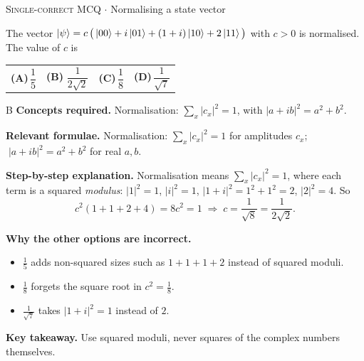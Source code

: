 \documentclass[11pt,a4paper]{article}
\newcommand{\optlabel}[1]{\textbf{(#1)}}
\newcommand{\correctlabel}[1]{\textcolor{okgreen}{\textbf{(#1)}\,\ding{51}}}
\newenvironment{qitem}[1]{\begin{list}{}{\setlength{\leftmargin}{3.3em}\setlength{\labelwidth}{3.1em}%
  \setlength{\labelsep}{0.2em}\setlength{\topsep}{3pt}\setlength{\parsep}{3pt}}\item[\textbf{Q.#1}\hfill]}{\end{list}}
\newcommand{\qsep}{\par\vspace{2pt}{\color{black!15}\hrule}\vspace{4pt}}
\newcommand{\qmeta}[2]{{\footnotesize\color{black!60}\textsc{#1} \;$\cdot$\; #2}\par}
\begin{document}
\begin{qitem}{12}
\qmeta{Single-correct MCQ}{Normalising a state vector}
The vector $\ket\psi = c\,\big(\ket{00} + i\ket{01} + (1 + i)\ket{10} + 2\ket{11}\big)$ with $c > 0$ is normalised. The value of $c$ is
\par\smallskip\noindent\begin{tabularx}{\linewidth}{@{}*{4}{L}@{}}
\optlabel{A}\,$\dfrac15$ & \correctlabel{B}\,$\dfrac{1}{2\sqrt2}$ & \optlabel{C}\,$\dfrac18$ & \optlabel{D}\,$\dfrac{1}{\sqrt7}$
\end{tabularx}
\end{qitem}
\begin{solbox}{B}
\textbf{\color{brand}Concepts required.} Normalisation: $\sum_x|c_x|^2 = 1$, with $|a + ib|^2 = a^2 + b^2$.

\textbf{\color{brand}Relevant formulae.} Normalisation: $\sum_x|c_x|^2 = 1$ for amplitudes $c_x$; $\;|a + ib|^2 = a^2 + b^2$ for real $a, b$.

\textbf{\color{brand}Step-by-step explanation.} Normalisation means $\sum_x|c_x|^2 = 1$, where each term is a squared \emph{modulus}: $|1|^2 = 1$, $|i|^2 = 1$, $|1 + i|^2 = 1^2 + 1^2 = 2$, $|2|^2 = 4$. So
\[ c^2(1 + 1 + 2 + 4) = 8c^2 = 1 \;\Rightarrow\; c = \frac{1}{\sqrt8} = \frac{1}{2\sqrt2}. \]

\textbf{\color{brand}Why the other options are incorrect.}
\begin{itemize}[leftmargin=2.4em, itemsep=1pt, topsep=2pt]
\item[\textbf{(A)}] $\frac15$ adds non-squared sizes such as $1 + 1 + 1 + 2$ instead of squared moduli.
\item[\textbf{(C)}] $\frac18$ forgets the square root in $c^2 = \frac18$.
\item[\textbf{(D)}] $\frac{1}{\sqrt7}$ takes $|1 + i|^2 = 1$ instead of $2$.
\end{itemize}
\textbf{\color{brand}Key takeaway.} Use squared moduli, never squares of the complex numbers themselves.
\end{solbox}
\qsep
\end{document}
